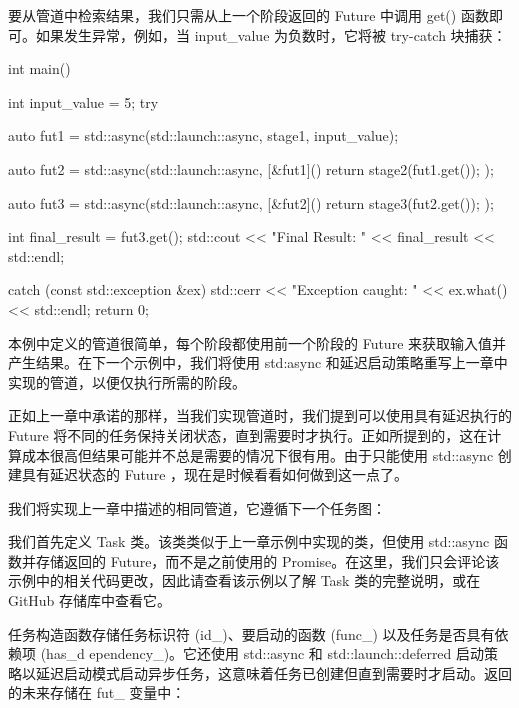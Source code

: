 要从管道中检索结果，我们只需从上一个阶段返回的 Future 中调用 get() 函数即可。如果发生异常，例如，当 input\_value 为负数时，它将被 try-catch 块捕获：

\begin{cpp}
int main() {
    int input_value = 5;
    try {
        auto fut1 = std::async(std::launch::async,
                          stage1, input_value);

        auto fut2 = std::async(std::launch::async,
                            [&fut1]() {
                                return stage2(fut1.get()); });

        auto fut3 = std::async(std::launch::async,
                            [&fut2]() {
                                return stage3(fut2.get()); });

        int final_result = fut3.get();
        std::cout << "Final Result: "
                  << final_result << std::endl;

    } catch (const std::exception &ex) {
        std::cerr << "Exception caught: "
                  << ex.what() << std::endl;
    }
    return 0;
}
\end{cpp}

本例中定义的管道很简单，每个阶段都使用前一个阶段的 Future 来获取输入值并产生结果。在下一个示例中，我们将使用 std:async 和延迟启动策略重写上一章中实现的管道，以便仅执行所需的阶段。


正如上一章中承诺的那样，当我们实现管道时，我们提到可以使用具有延迟执行的 Future 将不同的任务保持关闭状态，直到需要时才执行。正如所提到的，这在计算成本很高但结果可能并不总是需要的情况下很有用。由于只能使用 std::async 创建具有延迟状态的 Future ，现在是时候看看如何做到这一点了。

我们将实现上一章中描述的相同管道，它遵循下一个任务图：


我们首先定义 Task 类。该类类似于上一章示例中实现的类，但使用 std::async 函数并存储返回的 Future，而不是之前使用的 Promise。在这里，我们只会评论该示例中的相关代码更改，因此请查看该示例以了解 Task 类的完整说明，或在 GitHub 存储库中查看它。

任务构造函数存储任务标识符 (id\_)、要启动的函数 (func\_) 以及任务是否具有依赖项 (has\_d ependency\_)。它还使用 std::async 和 std::launch::deferred 启动策略以延迟启动模式启动异步任务，这意味着任务已创建但直到需要时才启动。返回的未来存储在 fut\_ 变量中：

